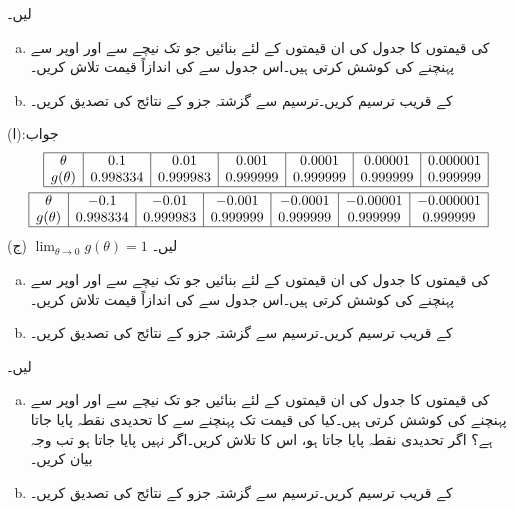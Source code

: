  لیں۔
\begin{enumerate}[a.]
\item
{} کی قیمتوں کا جدول  کی ان قیمتوں کے لئے بنائیں جو  تک نیچے سے اور اوپر سے پہنچنے کی کوشش کرتی ہیں۔اس جدول سے
  کی اندازاً قیمت تلاش کریں۔  
\item
{} کے قریب  ترسیم کریں۔ترسیم سے گزشتہ جزو کے نتائج کی تصدیق کریں۔
\end{enumerate}
جواب:(ا)
\begin{align*}
\begin{array}{|c|c|c|c|c|c|c|}
\hline
\theta&0.1&0.01&0.001&0.0001&0.00001&0.000001\\
g(\theta)&0.998334&0.999983&0.999999&0.999999&0.999999&0.999999\\
\hline
\end{array}\\
\begin{array}{|c|c|c|c|c|c|c|}
\hline
\theta&-0.1&-0.01&-0.001&-0.0001&-0.00001&-0.000001\\
g(\theta)&0.998334&0.999983&0.999999&0.999999&0.999999&0.999999\\
\hline
\end{array}
\end{align*}
(ج)
$\lim_{\theta \to 0} g(\theta)=1$
 لیں۔
\begin{enumerate}[a.]
\item
{} کی قیمتوں کا جدول  کی ان قیمتوں کے لئے بنائیں جو  تک نیچے سے اور اوپر سے پہنچنے کی کوشش کرتی ہیں۔اس جدول سے
  کی اندازاً قیمت تلاش کریں۔  
\item
{} کے قریب  ترسیم کریں۔ترسیم سے گزشتہ جزو کے نتائج کی تصدیق کریں۔
\end{enumerate}
 لیں۔
\begin{enumerate}[a.]
\item
{} کی قیمتوں کا جدول  کی ان قیمتوں کے لئے بنائیں جو  تک نیچے سے اور اوپر سے پہنچنے کی کوشش کرتی ہیں۔کیا  کی قیمت  تک پہنچنے سے  کا تحدیدی نقطہ پایا جاتا ہے؟ اگر تحدیدی نقطہ پایا جاتا ہو، اس کا تلاش کریں۔اگر نہیں پایا جاتا ہو تب وجہ بیان کریں۔
\item
{} کے قریب  ترسیم کریں۔ترسیم سے گزشتہ جزو کے نتائج کی تصدیق کریں۔
\end{enumerate}
